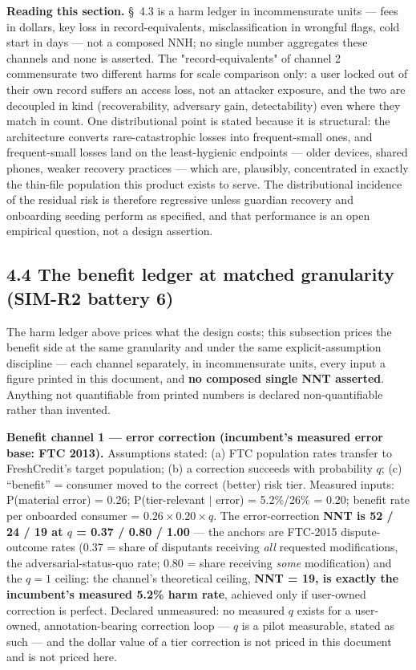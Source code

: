 \documentclass[11pt,twocolumn]{article}
\begin{document}
\textbf{Reading this section.} \S~4.3 is a harm ledger in incommensurate units --- fees in dollars, key loss in record-equivalents, misclassification in wrongful flags, cold start in days --- not a composed NNH; no single number aggregates these channels and none is asserted. The "record-equivalents" of channel 2 commensurate two different harms for scale comparison only: a user locked out of their own record suffers an access loss, not an attacker exposure, and the two are decoupled in kind (recoverability, adversary gain, detectability) even where they match in count. One distributional point is stated because it is structural: the architecture converts rare-catastrophic losses into frequent-small ones, and frequent-small losses land on the least-hygienic endpoints --- older devices, shared phones, weaker recovery practices --- which are, plausibly, concentrated in exactly the thin-file population this product exists to serve. The distributional incidence of the residual risk is therefore regressive unless guardian recovery and onboarding seeding perform as specified, and that performance is an open empirical question, not a design assertion.

\subsection*{4.4 The benefit ledger at matched granularity (SIM-R2 battery 6)}

The harm ledger above prices what the design costs; this subsection prices the benefit side at the same granularity and under the same explicit-assumption discipline --- each channel separately, in incommensurate units, every input a figure printed in this document, and \textbf{no composed single NNT asserted}. Anything not quantifiable from printed numbers is declared non-quantifiable rather than invented.

\textbf{Benefit channel 1 --- error correction (incumbent's measured error base: FTC 2013).} Assumptions stated: (a) FTC population rates transfer to FreshCredit's target population; (b) a correction succeeds with probability $q$; (c) ``benefit'' = consumer moved to the correct (better) risk tier. Measured inputs: P(material error) = 0.26; P(tier-relevant $|$ error) = 5.2\%/26\% = 0.20; benefit rate per onboarded consumer = $0.26 \times 0.20 \times q$. The error-correction \textbf{NNT is 52 / 24 / 19 at $q$ = 0.37 / 0.80 / 1.00} --- the anchors are FTC-2015 dispute-outcome rates (0.37 = share of disputants receiving \emph{all} requested modifications, the adversarial-status-quo rate; 0.80 = share receiving \emph{some} modification) and the $q = 1$ ceiling: the channel's theoretical ceiling, \textbf{NNT = 19, is exactly the incumbent's measured 5.2\% harm rate}, achieved only if user-owned correction is perfect. Declared unmeasured: no measured $q$ exists for a user-owned, annotation-bearing correction loop --- $q$ is a pilot measurable, stated as such --- and the dollar value of a tier correction is not priced in this document and is not priced here.
\end{document}
